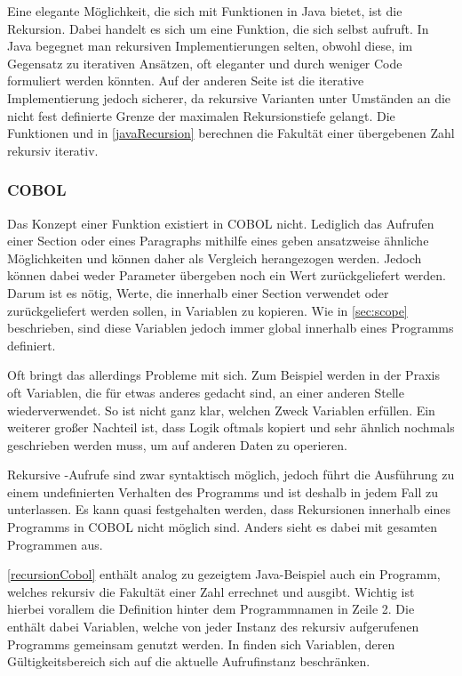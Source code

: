 Eine elegante Möglichkeit, die sich mit Funktionen in Java bietet, ist die Rekursion. Dabei handelt es sich um eine Funktion, die sich selbst aufruft. In Java begegnet man rekursiven Implementierungen selten, obwohl diese, im Gegensatz zu iterativen Ansätzen, oft eleganter und durch weniger Code formuliert werden könnten. Auf der anderen Seite ist die iterative Implementierung jedoch sicherer, da rekursive Varianten unter Umständen an die nicht fest definierte Grenze der maximalen Rekursionstiefe gelangt. Die Funktionen  und  in \autoref{javaRecursion} berechnen die Fakultät einer übergebenen Zahl rekursiv \bzw iterativ.


\subsubsection*{COBOL}
Das Konzept einer Funktion existiert in COBOL nicht. Lediglich das Aufrufen einer Section oder eines Paragraphs mithilfe eines  geben ansatzweise ähnliche Möglichkeiten und können daher als Vergleich herangezogen werden. Jedoch können dabei weder Parameter übergeben noch ein Wert zurückgeliefert werden. Darum ist es nötig, Werte, die innerhalb einer Section verwendet oder zurückgeliefert werden sollen, in Variablen zu kopieren. Wie in \autoref{sec:scope} beschrieben, sind diese Variablen jedoch immer global innerhalb eines Programms definiert.

Oft bringt das allerdings Probleme mit sich. Zum Beispiel werden in der Praxis oft Variablen, die für etwas anderes gedacht sind, an einer anderen Stelle wiederverwendet. So ist nicht ganz klar, welchen Zweck Variablen erfüllen. Ein weiterer großer Nachteil ist, dass Logik oftmals kopiert und sehr ähnlich nochmals geschrieben werden muss, um auf anderen Daten zu operieren.


Rekursive -Aufrufe sind zwar syntaktisch möglich, jedoch führt die Ausführung zu einem undefinierten Verhalten des Programms und ist deshalb in jedem Fall zu unterlassen. Es kann quasi festgehalten werden, dass Rekursionen innerhalb eines Programms in COBOL nicht möglich sind. Anders sieht es dabei mit gesamten Programmen aus.

\autoref{recursionCobol} enthält analog zu gezeigtem Java-Beispiel auch ein Programm, welches rekursiv die Fakultät einer Zahl errechnet und ausgibt. Wichtig ist hierbei vorallem die  Definition hinter dem Programmnamen in Zeile 2. Die  enthält dabei Variablen, welche von jeder Instanz des rekursiv aufgerufenen Programms gemeinsam genutzt werden. In  finden sich Variablen, deren Gültigkeitsbereich sich auf die aktuelle Aufrufinstanz beschränken.


